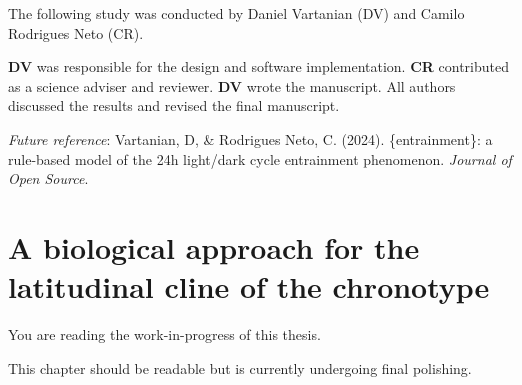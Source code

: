 \documentclass[
12pt,
openright,
oneside,
a4paper,
chapter=TITLE,
section=TITLE,
french,
spanish,
brazil,
english
]{abntex2}\usepackage{array}
\newcommand{\microskip}{\vspace{\microskipamount}}
\begin{document}
\begin{tcolorbox}[enhanced jigsaw, colframe=quarto-callout-note-color-frame, coltitle=black, opacityback=0, left=2mm, opacitybacktitle=0.6, rightrule=.15mm, leftrule=.75mm, colbacktitle=quarto-callout-note-color!10!white, titlerule=0mm, title=\textcolor{quarto-callout-note-color}{\faInfo}\hspace{0.5em}{Note}, colback=white, breakable, bottomtitle=1mm, toptitle=1mm, arc=.35mm, bottomrule=.15mm, toprule=.15mm]

The following study was conducted by Daniel Vartanian (DV) and Camilo
Rodrigues Neto (CR).

\microskip

\textbf{DV} was responsible for the design and software implementation.
\textbf{CR} contributed as a science adviser and reviewer. \textbf{DV}
wrote the manuscript. All authors discussed the results and revised the
final manuscript.

\microskip

\emph{Future reference}: Vartanian, D, \& Rodrigues Neto, C. (2024).
\{entrainment\}: a rule-based model of the 24h light/dark cycle
entrainment phenomenon. \emph{Journal of Open Source}.

\end{tcolorbox}


\chapter{A biological approach for the latitudinal cline of the
chronotype}\label{a-biological-approach-for-the-latitudinal-cline-of-the-chronotype}

\begin{tcolorbox}[enhanced jigsaw, colframe=quarto-callout-note-color-frame, coltitle=black, opacityback=0, left=2mm, opacitybacktitle=0.6, rightrule=.15mm, leftrule=.75mm, colbacktitle=quarto-callout-note-color!10!white, titlerule=0mm, title=\textcolor{quarto-callout-note-color}{\faInfo}\hspace{0.5em}{Note}, colback=white, breakable, bottomtitle=1mm, toptitle=1mm, arc=.35mm, bottomrule=.15mm, toprule=.15mm]

You are reading the work-in-progress of this thesis.

\microskip

This chapter should be readable but is currently undergoing final
polishing.

\end{tcolorbox}
\end{document}
